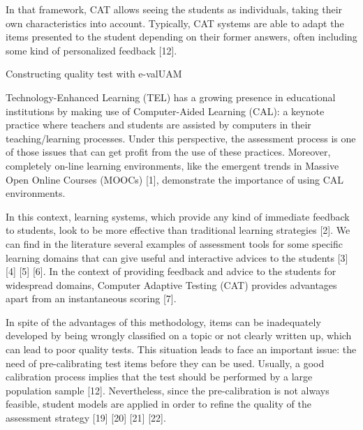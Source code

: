 In that framework, CAT allows seeing the
students as individuals, taking their own characteristics into
account. Typically, CAT systems are able to adapt the items
presented to the student depending on their former answers, often
including some kind of personalized feedback [12].



Constructing quality test with e-valUAM

Technology-Enhanced Learning (TEL) has a growing presence in educational institutions by making use of Computer-Aided Learning (CAL): a keynote practice where teachers and students are assisted by computers in their teaching/learning processes. Under this perspective, the assessment process is one of those issues that can get profit from the use of these practices. Moreover, completely on-line learning environments, like the emergent trends in Massive Open Online Courses (MOOCs) [1], demonstrate the importance of using CAL environments.

In this context, learning systems, which provide any kind of immediate feedback to students, look to be more effective than traditional learning strategies [2]. We can find in the literature several examples of assessment tools for some specific learning domains that can give useful and interactive advices to the students [3] [4] [5] [6]. In the context of providing feedback and advice to the students for widespread domains, Computer Adaptive Testing (CAT) provides advantages apart from an instantaneous scoring [7]. 

In spite of the advantages of this methodology, items can be inadequately developed by being wrongly classified on a topic or not clearly written up, which can lead to poor quality tests. This situation leads to face an important issue: the need of pre-calibrating test items before they can be used. Usually, a good calibration process implies that the test should be performed by a large population sample [12]. Nevertheless, since the pre-calibration is not always feasible, student models are applied in order to refine the quality of the assessment strategy [19] [20] [21] [22].